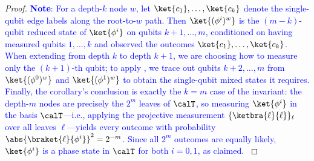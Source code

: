 \begin{proof}
    \textcolor{blue}{\textbf{Note}: For a depth-$k$ node $w$, let $\ket{c_1}, \ldots, \ket{c_k}$ denote the single-qubit edge labels along the root-to-$w$ path. Then $\ket{(\phi^i)^{w}}$ is the $(m-k)$-qubit reduced state of $\ket{\phi^i}$ on qubits $k+1, \ldots, m$, conditioned on having measured qubits $1, \ldots, k$ and observed the outcomes $\ket{c_1}, \ldots, \ket{c_k}$. When extending from depth $k$ to depth $k+1$, we are choosing how to measure only the $(k+1)$-th qubit; to apply , we trace out qubits $k+2, \ldots, m$ from $\ket{(\phi^0)^{w}}$ and $\ket{(\phi^1)^{w}}$ to obtain the single-qubit mixed states it requires.
    Finally, the corollary's conclusion is exactly the $k = m$ case of the invariant: the depth-$m$ nodes are precisely the $2^m$ leaves of $\calT$, so measuring $\ket{\phi^i}$ in the basis $\calT$---i.e., applying the projective measurement $\{\ketbra{\ell}{\ell}\}_{\ell}$ over all leaves $\ell$---yields every outcome with probability $\abs{\braket{\ell}{\phi^i}}^2 = 2^{-m}$. Since all $2^m$ outcomes are equally likely, $\ket{\phi^i}$ is a phase state in $\calT$ for both $i = 0, 1$, as claimed.
    }
\end{proof}

